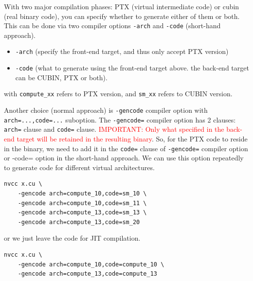 With two major compilation phases: PTX (virtual intermediate code) or cubin
(real binary code), you can specify whether to generate either of them or both.
This can be done via two compiler options \verb!-arch!  and \verb!-code!
(short-hand approach).
\begin{itemize}
\item \verb!-arch!  (specify the front-end target, and thus only accept
PTX version) 
\item \verb!-code! (what to generate using the front-end target above.
the back-end target can be CUBIN, PTX or both).
\end{itemize}
with \verb!compute_xx! refers to PTX version, and \verb!sm_xx! refers to CUBIN
version. 

Another choice (normal approach) is \verb!-gencode! compiler option with
\verb!arch=...,code=...! suboption. The \verb!-gencode=! compiler option has 2
clauses: \verb!arch=! clause and \verb!code=! clause. 
\textcolor{red}{IMPORTANT: Only what specified in the back-end target  will be
retained in the resulting binary}. So, for the PTX code to reside in the binary,
we need to add it in the \verb!code=! clause of \verb!-gencode=! compiler
option or -code= option in the short-hand approach.  We can use this option
repeatedly to generate code for different virtual architectures.
\begin{verbatim}
nvcc x.cu \
    -gencode arch=compute_10,code=sm_10 \
    -gencode arch=compute_10,code=sm_11 \
    -gencode arch=compute_13,code=sm_13 \
    -gencode arch=compute_13,code=sm_20
\end{verbatim}
or we just leave the code for JIT compilation.
\begin{verbatim}
nvcc x.cu \
    -gencode arch=compute_10,code=compute_10 \
    -gencode arch=compute_13,code=compute_13
\end{verbatim}

